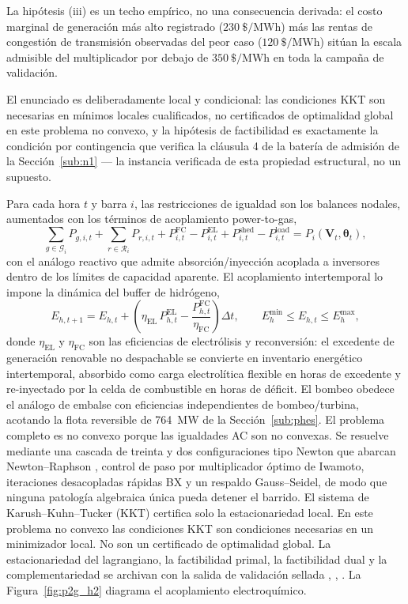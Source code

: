 La hipótesis (iii) es un techo empírico, no una consecuencia derivada: el costo marginal de generación más alto registrado ($230\ \text{\$}/\mathrm{MWh}$) más las rentas de congestión de transmisión observadas del peor caso ($120\ \text{\$}/\mathrm{MWh}$) sitúan la escala admisible del multiplicador por debajo de $350\ \text{\$}/\mathrm{MWh}$ en toda la campaña de validación.

El enunciado es deliberadamente local y condicional: las condiciones KKT son necesarias en mínimos locales cualificados, no certificados de optimalidad global en este problema no convexo, y la hipótesis de factibilidad es exactamente la condición por contingencia que verifica la cláusula 4 de la batería de admisión de la Sección~\ref{sub:n1} --- la instancia verificada de esta propiedad estructural, no un supuesto.

Para cada hora $t$ y barra $i$, las restricciones de igualdad son los balances nodales, aumentados con los términos de acoplamiento power-to-gas,
\begin{equation}
\sum_{g \in \mathcal{G}_i} P_{g,i,t} + \sum_{r \in \mathcal{R}_i} P_{r,i,t} + P_{i,t}^{\mathrm{FC}} - P_{i,t}^{\mathrm{EL}} + P_{i,t}^{\mathrm{shed}} - P_{i,t}^{\mathrm{load}} = P_i(\mathbf{V}_t, \boldsymbol{\theta}_t),
\label{eq:opf_balance}
\end{equation}
con el análogo reactivo que admite absorción/inyección acoplada a inversores dentro de los límites de capacidad aparente. El acoplamiento intertemporal lo impone la dinámica del buffer de hidrógeno,
\begin{equation}
E_{h,t+1} = E_{h,t} + \left(\eta_{\mathrm{EL}}\, P_{h,t}^{\mathrm{EL}} - \frac{P_{h,t}^{\mathrm{FC}}}{\eta_{\mathrm{FC}}}\right) \Delta t, \qquad E_h^{\min} \le E_{h,t} \le E_h^{\max},
\label{eq:h2_storage}
\end{equation}
donde $\eta_{\mathrm{EL}}$ y $\eta_{\mathrm{FC}}$ son las eficiencias de electrólisis y reconversión: el excedente de generación renovable no despachable se convierte en inventario energético intertemporal, absorbido como carga electrolítica flexible en horas de excedente y re-inyectado por la celda de combustible en horas de déficit. El bombeo obedece el análogo de embalse con eficiencias independientes de bombeo/turbina, acotando la flota reversible de 764~MW de la Sección~\ref{sub:phes}. El problema completo es no convexo porque las igualdades AC son no convexas. Se resuelve mediante una cascada de treinta y dos configuraciones tipo Newton que abarcan Newton--Raphson \cite{tinney1967}, control de paso por multiplicador óptimo de Iwamoto, iteraciones desacopladas rápidas BX \cite{stott1974} y un respaldo Gauss--Seidel, de modo que ninguna patología algebraica única pueda detener el barrido. El sistema de Karush--Kuhn--Tucker (KKT) certifica solo la estacionariedad local. En este problema no convexo las condiciones KKT son condiciones necesarias en un minimizador local. No son un certificado de optimalidad global. La estacionariedad del lagrangiano, la factibilidad primal, la factibilidad dual y la complementariedad se archivan con la salida de validación sellada \cite{nocedal2006}, \cite{dommel1968}, \cite{wood2013}. La Figura~\ref{fig:p2g_h2} diagrama el acoplamiento electroquímico.

